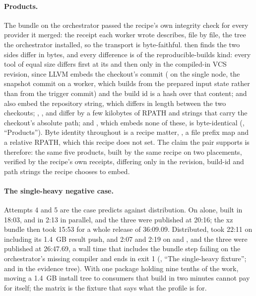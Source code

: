 \paragraph{Products.}
The bundle on the orchestrator passed the recipe's own integrity check for
every provider it merged: the receipt each worker wrote describes, file by
file, the tree the orchestrator installed, so the transport is byte-faithful.
 then finds the two sides differ in bytes, and every
difference is of the reproducible-builds kind: every tool of equal size
differs first at its  and then only in the compiled-in
VCS revision, since LLVM embeds the checkout's commit ( on the
single node, the snapshot commit  on a worker, which builds
from the prepared input state rather than from the trigger commit) and the
build id is a hash over that content;  and  also
embed the repository string, which differs in length between the two
checkouts; , ,  and
 differ by a few kilobytes of RPATH and 
strings that carry the checkout's absolute path; and ,
which embeds none of these, is byte-identical (,
``Products''). Byte identity throughout is a recipe matter,
, a file prefix map and a relative RPATH,
which this recipe does not set. The claim the pair supports is therefore: the
same five products, built by the same recipe on two placements, verified by
the recipe's own receipts, differing only in the revision, build-id and path
strings the recipe chooses to embed.

\paragraph{The single-heavy negative case.}
Attempts 4 and 5 are the case  predicts against distribution. On
 alone,  built in 18:03,  and  in
2:13 in parallel, and the three were published at 20:16; the xz bundle then
took 15:53 for a whole release of 36:09.09. Distributed,  took
22:11 on  including its 1.4~GB result push,  and
 2:07 and 2:19 on  and , and the three were
published at 26:47.69, a wall time that includes the bundle step failing on
the orchestrator's missing compiler and ends in exit 1 (,
``The single-heavy fixture'';  and
 in the evidence tree). With one
package holding nine tenths of the work, moving a 1.4~GB install tree to
consumers that build in two minutes cannot pay for itself; the matrix is the
fixture that says what the profile is for.


